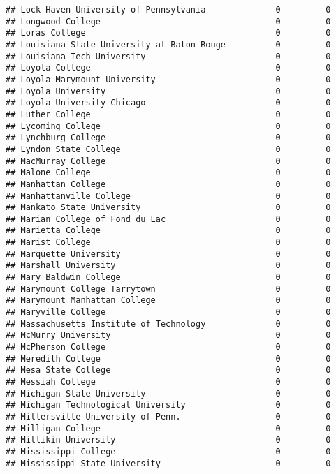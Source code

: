 \documentclass[
]{article}
\begin{document}
\begin{verbatim}
## Lock Haven University of Pennsylvania              0         0
## Longwood College                                   0         0
## Loras College                                      0         0
## Louisiana State University at Baton Rouge          0         0
## Louisiana Tech University                          0         0
## Loyola College                                     0         0
## Loyola Marymount University                        0         0
## Loyola University                                  0         0
## Loyola University Chicago                          0         0
## Luther College                                     0         0
## Lycoming College                                   0         0
## Lynchburg College                                  0         0
## Lyndon State College                               0         0
## MacMurray College                                  0         0
## Malone College                                     0         0
## Manhattan College                                  0         0
## Manhattanville College                             0         0
## Mankato State University                           0         0
## Marian College of Fond du Lac                      0         0
## Marietta College                                   0         0
## Marist College                                     0         0
## Marquette University                               0         0
## Marshall University                                0         0
## Mary Baldwin College                               0         0
## Marymount College Tarrytown                        0         0
## Marymount Manhattan College                        0         0
## Maryville College                                  0         0
## Massachusetts Institute of Technology              0         0
## McMurry University                                 0         0
## McPherson College                                  0         0
## Meredith College                                   0         0
## Mesa State College                                 0         0
## Messiah College                                    0         0
## Michigan State University                          0         0
## Michigan Technological University                  0         0
## Millersville University of Penn.                   0         0
## Milligan College                                   0         0
## Millikin University                                0         0
## Mississippi College                                0         0
## Mississippi State University                       0         0

\end{verbatim}
\end{document}
